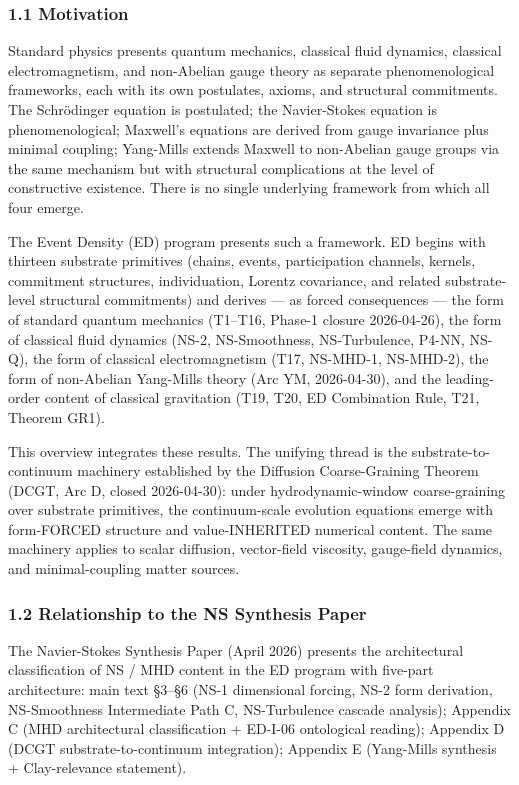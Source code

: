\documentclass[
]{article}
\begin{document}
\subsubsection{1.1 Motivation}\label{motivation}

Standard physics presents quantum mechanics, classical fluid dynamics,
classical electromagnetism, and non-Abelian gauge theory as separate
phenomenological frameworks, each with its own postulates, axioms, and
structural commitments. The Schrödinger equation is postulated; the
Navier-Stokes equation is phenomenological; Maxwell's equations are
derived from gauge invariance plus minimal coupling; Yang-Mills extends
Maxwell to non-Abelian gauge groups via the same mechanism but with
structural complications at the level of constructive existence. There
is no single underlying framework from which all four emerge.

The Event Density (ED) program presents such a framework. ED begins with
thirteen substrate primitives (chains, events, participation channels,
kernels, commitment structures, individuation, Lorentz covariance, and
related substrate-level structural commitments) and derives --- as
forced consequences --- the form of standard quantum mechanics (T1--T16,
Phase-1 closure 2026-04-26), the form of classical fluid dynamics (NS-2,
NS-Smoothness, NS-Turbulence, P4-NN, NS-Q), the form of classical
electromagnetism (T17, NS-MHD-1, NS-MHD-2), the form of non-Abelian
Yang-Mills theory (Arc YM, 2026-04-30), and the leading-order content of
classical gravitation (T19, T20, ED Combination Rule, T21, Theorem GR1).

This overview integrates these results. The unifying thread is the
substrate-to-continuum machinery established by the Diffusion
Coarse-Graining Theorem (DCGT, Arc D, closed 2026-04-30): under
hydrodynamic-window coarse-graining over substrate primitives, the
continuum-scale evolution equations emerge with form-FORCED structure
and value-INHERITED numerical content. The same machinery applies to
scalar diffusion, vector-field viscosity, gauge-field dynamics, and
minimal-coupling matter sources.

\subsubsection{1.2 Relationship to the NS Synthesis
Paper}\label{relationship-to-the-ns-synthesis-paper}

The Navier-Stokes Synthesis Paper (April 2026) presents the
architectural classification of NS / MHD content in the ED program with
five-part architecture: main text §3--§6 (NS-1 dimensional forcing, NS-2
form derivation, NS-Smoothness Intermediate Path C, NS-Turbulence
cascade analysis); Appendix C (MHD architectural classification +
ED-I-06 ontological reading); Appendix D (DCGT substrate-to-continuum
integration); Appendix E (Yang-Mills synthesis + Clay-relevance
statement).
\end{document}
